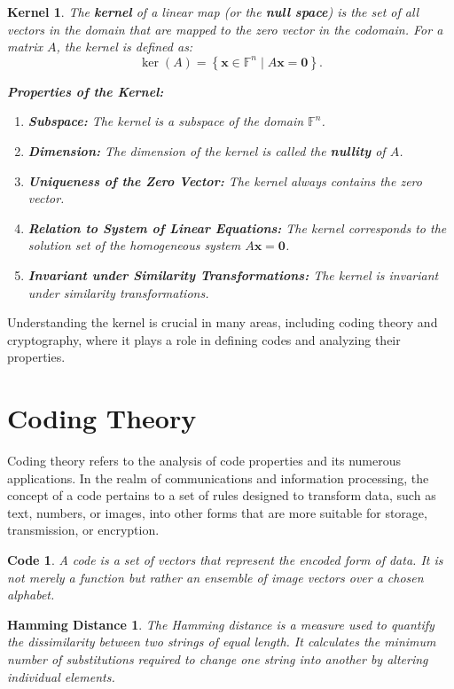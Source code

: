 \newtheorem*{krl}{Kernel}
\begin{krl}
The \textbf{kernel} of a linear map (or the \textbf{null space}) is the set of all vectors in the domain that are mapped to the zero vector in the codomain. For a matrix \(A\), the kernel is defined as:
\[
\ker(A) = \left\{ \mathbf{x} \in \mathbb{F}^n \mid A\mathbf{x} = \mathbf{0} \right\}.
\]

\textbf{Properties of the Kernel:}
\begin{enumerate}
    \item \textbf{Subspace:} The kernel is a subspace of the domain \(\mathbb{F}^n\).
    \item \textbf{Dimension:} The dimension of the kernel is called the \textbf{nullity} of \(A\).
    \item \textbf{Uniqueness of the Zero Vector:} The kernel always contains the zero vector.
    \item \textbf{Relation to System of Linear Equations:} The kernel corresponds to the solution set of the homogeneous system \(A\mathbf{x} = \mathbf{0}\).
    \item \textbf{Invariant under Similarity Transformations:} The kernel is invariant under similarity transformations.
\end{enumerate}
\end{krl}

Understanding the kernel is crucial in many areas, including coding theory and cryptography, where it plays a role in defining codes and analyzing their properties.


\section{Coding Theory}
Coding theory refers to the analysis of code properties and its numerous applications. In the realm of communications and information processing, the concept of a code pertains to a set of rules designed to transform data, such as text, numbers, or images, into other forms that are more suitable for storage, transmission, or encryption.

\newtheorem*{cd}{Code}
\begin{cd}
A code is a set of vectors that represent the encoded form of data. It is not merely a function but rather an ensemble of image vectors over a chosen alphabet.
\end{cd}

\newtheorem*{hmm}{Hamming Distance}
\begin{hmm}
The Hamming distance is a measure used to quantify the dissimilarity between two strings of equal length. It calculates the minimum number of substitutions required to change one string into another by altering individual elements.
\end{hmm}


